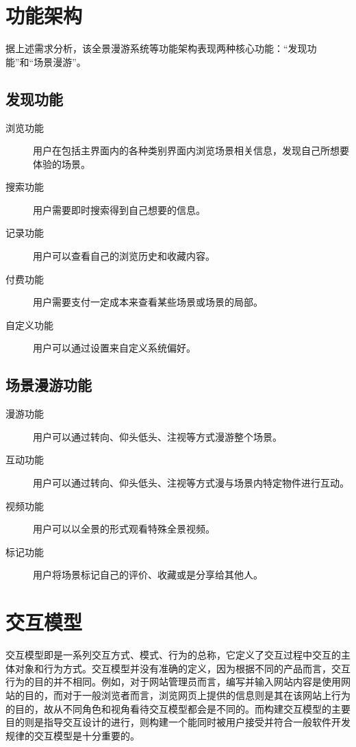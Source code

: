 \section{功能架构}
据上述需求分析，该全景漫游系统等功能架构表现两种核心功能：“发现功能”和“场景漫游”。

\subsection{发现功能}
\begin{description}
	\item [浏览功能] 用户在包括主界面内的各种类别界面内浏览场景相关信息，发现自己所想要体验的场景。
	\item [搜索功能] 用户需要即时搜索得到自己想要的信息。
	\item [记录功能] 用户可以查看自己的浏览历史和收藏内容。
	\item [付费功能] 用户需要支付一定成本来查看某些场景或场景的局部。
	\item [自定义功能] 用户可以通过设置来自定义系统偏好。
\end{description}

\subsection{场景漫游功能}

\begin{description}
	\item [漫游功能] 用户可以通过转向、仰头低头、注视等方式漫游整个场景。
	\item [互动功能] 用户可以通过转向、仰头低头、注视等方式漫与场景内特定物件进行互动。
	\item [视频功能] 用户可以以全景的形式观看特殊全景视频。
	\item [标记功能] 用户将场景标记自己的评价、收藏或是分享给其他人。
\end{description}

\section{交互模型}
交互模型即是一系列交互方式、模式、行为的总称，它定义了交互过程中交互的主体对象和行为方式。交互模型并没有准确的定义，因为根据不同的产品而言，交互行为的目的并不相同。例如，对于网站管理员而言，编写并输入网站内容是使用网站的目的，而对于一般浏览者而言，浏览网页上提供的信息则是其在该网站上行为的目的，故从不同角色和视角看待交互模型都会是不同的。而构建交互模型的主要目的则是指导交互设计的进行，则构建一个能同时被用户接受并符合一般软件开发规律的交互模型是十分重要的。

